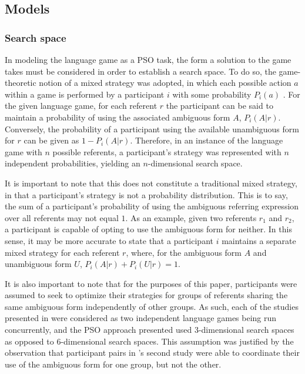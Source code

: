 \documentclass[12pt,a4paper]{article}
\begin{document}
\subsection{Models}
\subsubsection{Search space}
\label{sec:search_space}

In modeling the \citeauthor{rohde2012} language game as a PSO task, the form a solution to the game takes must be considered in order to establish a search space.  To do so, the game-theoretic notion of a mixed strategy was adopted, in which each possible action $a$ within a game is performed by a participant $i$ with some probability $P_i(a)$ \citep[p.~22]{benz2005}. For the given language game, for each referent $r$ the participant can be said to maintain a probability of using the associated ambiguous form $A$, $P_i(A|r)$. Conversely, the probability of a participant using the available unambiguous form for $r$ can be given as $1 - P_i(A|r)$. Therefore, in an instance of the \citeauthor{rohde2012} language game with $n$ possible referents, a participant's strategy was represented with $n$ independent probabilities, yielding an $n$-dimensional search space. 

It is important to note that this does not constitute a traditional mixed strategy, in that a participant's strategy is not a probability distribution. This is to say, the sum of a participant's probability of using the ambiguous referring expression over all referents may not equal $1$. As an example, given two referents $r_1$ and $r_2$, a participant is capable of opting to use the ambiguous form for neither. In this sense, it may be more accurate to state that a participant $i$ maintains a separate mixed strategy for each referent $r$, where, for the ambiguous form $A$ and unambiguous form $U$, $P_i(A|r) + P_i(U|r) = 1$.

It is also important to note that for the purposes of this paper, participants were assumed to seek to optimize their strategies for groups of referents sharing the same ambiguous form independently of other groups. As such, each of the studies presented in \citeauthor{rohde2012} were considered as two independent language games being run concurrently, and the PSO approach presented used 3-dimensional search spaces as opposed to 6-dimensional search spaces. This assumption was justified by the observation that participant pairs in \citeauthor{rohde2012}'s second study were able to coordinate their use of the ambiguous form for one group, but not the other. 
\end{document}
